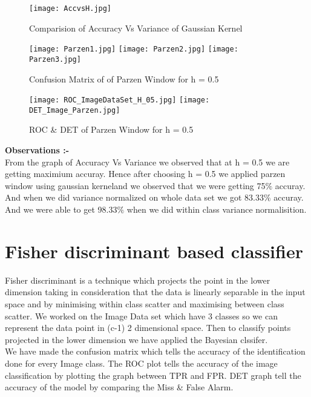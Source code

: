 \documentclass[12pt]{report}
\begin{document}


\begin{figure}[H]
	\centering
	\texttt{[image: AccvsH.jpg]}
	\caption{Comparision of Accuracy Vs Variance of Gaussian Kernel}
\end{figure}

\begin{figure}[H]
		\texttt{[image: Parzen1.jpg]}
		\texttt{[image: Parzen2.jpg]}
		\texttt{[image: Parzen3.jpg]}
	\caption{Confusion Matrix of of Parzen Window for h = 0.5}
\end{figure}


\begin{figure}[H]

	\texttt{[image: ROC\_ImageDataSet\_H\_05.jpg]}
	\texttt{[image: DET\_Image\_Parzen.jpg]}
	\caption{ROC \& DET  of Parzen Window for h = 0.5 }
\end{figure}


\noindent
{\bfseries Observations :-}\\
From the graph of Accuracy Vs Variance we observed that at h = 0.5 we are getting maximium accuray. Hence after choosing h = 0.5 we applied parzen window using gaussian kerneland we observed that we were getting 75$ \% $ accuray. And when we did variance normalized on whole data set we got 83.33$ \% $ accuray. And we were able to get 98.33$ \% $ when we did within class variance normalisition.


\section{Fisher discriminant based classifier}
Fisher discriminant is a technique which projects the point in the lower dimension taking in consideration that the data is linearly separable in the input space and by minimising within class scatter and maximising between class scatter. We worked on the Image Data set which have 3 classes so we can represent the data point in (c-1) 2 dimensional space. Then to classify points projected in the lower dimension we have applied the Bayesian clssifer.\\

\noindent
We have made the confusion matrix which tells the accuracy of the identification done for every Image class. The ROC plot tells the accuracy of the image classification by plotting the graph between TPR and FPR. DET graph tell the accuracy of the model by comparing the Miss \& False Alarm.
\end{document}
